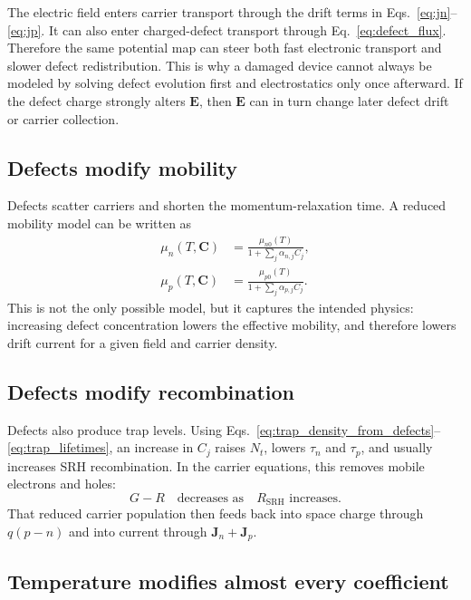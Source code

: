 \documentclass[11pt]{article}
\newcommand{\Evec}{\bm{E}}
\newcommand{\Jvec}{\bm{J}}
\newcommand{\Cvec}{\bm{C}}
\begin{document}
The electric field enters carrier transport through the drift terms in Eqs.~\eqref{eq:jn}--\eqref{eq:jp}. It can also enter charged-defect transport through Eq.~\eqref{eq:defect_flux}. Therefore the same potential map can steer both fast electronic transport and slower defect redistribution. This is why a damaged device cannot always be modeled by solving defect evolution first and electrostatics only once afterward. If the defect charge strongly alters \(\Evec\), then \(\Evec\) can in turn change later defect drift or carrier collection.

\subsection{Defects modify mobility}

Defects scatter carriers and shorten the momentum-relaxation time. A reduced mobility model can be written as
\begin{align}
\mu_n(T,\Cvec) &= \frac{\mu_{n0}(T)}{1+\sum_j \alpha_{n,j}C_j}, \\
\mu_p(T,\Cvec) &= \frac{\mu_{p0}(T)}{1+\sum_j \alpha_{p,j}C_j}.
\end{align}
This is not the only possible model, but it captures the intended physics: increasing defect concentration lowers the effective mobility, and therefore lowers drift current for a given field and carrier density.

\subsection{Defects modify recombination}

Defects also produce trap levels. Using Eqs.~\eqref{eq:trap_density_from_defects}--\eqref{eq:trap_lifetimes}, an increase in \(C_j\) raises \(N_t\), lowers \(\tau_n\) and \(\tau_p\), and usually increases SRH recombination. In the carrier equations, this removes mobile electrons and holes:
\begin{equation}
G-R \quad \text{decreases as} \quad R_{\mathrm{SRH}} \text{ increases}.
\end{equation}
That reduced carrier population then feeds back into space charge through \(q(p-n)\) and into current through \(\Jvec_n+\Jvec_p\).

\subsection{Temperature modifies almost every coefficient}
\end{document}
